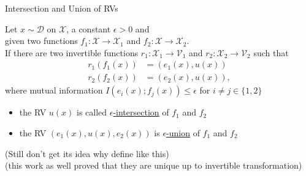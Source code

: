 \documentclass[10pt, aspectratio=169]{beamer}
\begin{document}
	\begin{frame}{Intersection and Union of RVs}
		\begin{definition}
			Let $x\sim\mathcal{D}$ on $\mathcal{X}$, a constant $\epsilon>0$ and\\
			given two functions $f_1:\mathcal{X}\to\mathcal{X}_1$ and $f_2:\mathcal{X}\to\mathcal{X}_2$.\\
			If there are two invertible functions $r_1:\mathcal{X}_1\to\mathcal{V}_1$ and $r_2:\mathcal{X}_2\to\mathcal{V}_2$
			such that
			\begin{align*}
				r_1(f_1(x)) &= (e_1(x),u(x))\\
				r_2(f_2(x)) &= (e_2(x),u(x)),
			\end{align*}
			where mutual information $I(e_i(x);f_j(x))\leqslant\epsilon$ for $i\neq j\in\{1,2\}$
			\begin{itemize}
				\item the RV $u(x)$ is called \underline{$\epsilon$-intersection} of $f_1$ and $f_2$
				\item the RV $(e_1(x), u(x), e_2(x))$ is \underline{$\epsilon$-union} of $f_1$ and $f_2$
			\end{itemize}
		\end{definition}
		(Still don't get its idea why define like this)\\
		(this work as well proved that they are unique up to invertible transformation)
	\end{frame}
	
\end{document}
